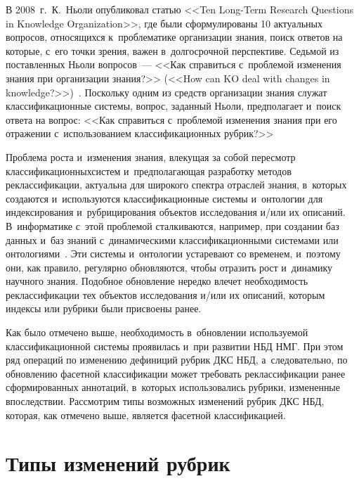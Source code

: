 \begin{multicols}{2}
     В 2008~г.\ К.~Ньоли опубликовал статью <<Ten Long-Term Research 
Questions in Knowledge Organization>>, где были сформулированы 10 
актуальных вопросов, относящихся к~проблематике организации знания, поиск 
ответов на которые, с~его точки зрения, важен в~долгосрочной перспективе. 
Седьмой из поставленных Ньоли вопросов~--- <<Как справиться с~проблемой 
изменения знания при организации знания?>> (<<How can KO deal with changes 
     in knowledge?>>)~\cite[с.~142--143]{19-gon}. Поскольку одним из средств 
организации знания служат классификационные системы, вопрос, заданный 
Ньоли, предполагает и~поиск ответа на вопрос: <<Как справиться с~проблемой 
изменения знания при его отражении с~использованием классификационных 
рубрик?>>
     
     Проблема роста и~изменения знания, влеку\-щая за собой пересмотр 
классификационных\linebreak сис\-тем и~предполагающая разработку методов 
реклассификации, актуальна для широкого спектра отраслей знания, в~которых 
создаются и~используются классификационные системы и~онтологии для 
индексирования и~рубрицирования объектов исследования и/или их описаний. 
В~информатике с~этой проблемой сталкиваются, например, при создании баз 
данных и~баз знаний с~динамическими классификационными системами или 
онтологиями~\cite{20-gon}. Эти системы и~онтологии устаревают со временем, 
и~поэтому они, как правило, регулярно обновляются, чтобы отразить рост 
и~динамику научного знания. Подобное обновление нередко влечет 
необходимость реклассификации тех объектов исследования и/или их 
описаний, которым индексы или рубрики были присвоены ранее.
     
     Как было отмечено выше, необходимость в~обновлении используемой 
классификационной сис\-те\-мы проявилась и~при развитии НБД НМГ. При этом 
ряд операций по изменению дефиниций рубрик ДКС НБД, а~следовательно, по 
об\-нов\-ле\-нию фасетной классификации может требовать реклассификации ранее 
сформированных аннотаций, в~которых использовались рубрики, измененные 
впоследствии. Рассмотрим типы возможных изменений рубрик ДКС НБД, 
которая, как отмечено выше, является фасетной классификацией.

\vspace*{-6pt}


\vspace*{-6pt}

\section{Типы изменений рубрик}
\vspace*{-2pt}


\end{multicols}
